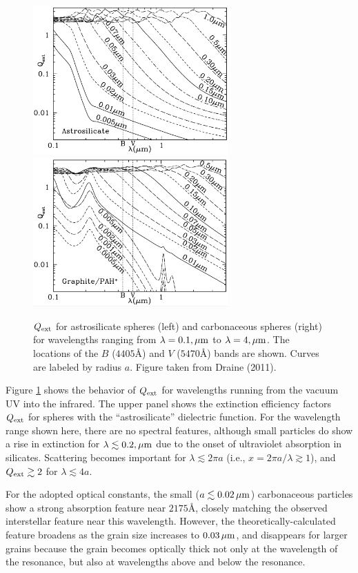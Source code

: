 \documentclass[a4paper,10pt]{article}
\begin{document}
\begin{figure}[b]
    \centering
    \includegraphics[width=7.5cm]{figures/Qext_BV_top.png}
    \includegraphics[width=7.5cm]{figures/Qext_BV_bottom.png}
    \caption{\footnotesize{$Q_{\rm ext}$ for astrosilicate spheres (left) and carbonaceous spheres (right) for wavelengths ranging from $\lambda=0.1,\mu{\rm m}$ to $\lambda=4,\mu{\rm m}$. The locations of the $B$ ($4405$\AA) and $V$ ($5470$\AA) bands are shown. Curves are labeled by radius $a$. Figure taken from Draine (2011).}}
    \label{fig:QextBV}
\end{figure}

{\noindent}Figure \ref{fig:QextBV} shows the behavior of $Q_{\rm ext}$ for wavelengths running from the vacuum UV into the infrared. The upper panel shows the extinction efficiency factors $Q_{\rm ext}$ for spheres with the ``astrosilicate'' dielectric function. For the wavelength range shown here, there are no spectral features, although small particles do show a rise in extinction for $\lambda\lesssim0.2,\mu{\rm m}$ due to the onset of ultraviolet absorption in silicates. Scattering becomes important for $\lambda\lesssim2\pi a$ (i.e., $x=2\pi a/\lambda\gtrsim1$), and $Q_{\rm ext}\gtrsim2$ for $\lambda\lesssim4a$.

{\noindent}For the adopted optical constants, the small ($a\lesssim0.02\,\mu{\rm m}$) carbonaceous particles show a strong absorption feature near $2175$\AA, closely matching the observed interstellar feature near this wavelength. However, the theoretically-calculated feature broadens as the grain size increases to $0.03\,\mu{\rm m}$, and disappears for larger grains because the grain becomes optically thick not only at the wavelength of the resonance, but also at wavelengths above and below the resonance.
\end{document}
